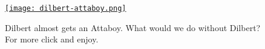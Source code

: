 
\begin{figure}[htbp]
\centering
\href{http://www.dilbert.com/}{\texttt{[image: dilbert-attaboy.png]}}
\caption{Dilbert almost gets an Attaboy. What would we do without Dilbert? For more click and enjoy.}
\label{fig:4126X1}
\end{figure}







%